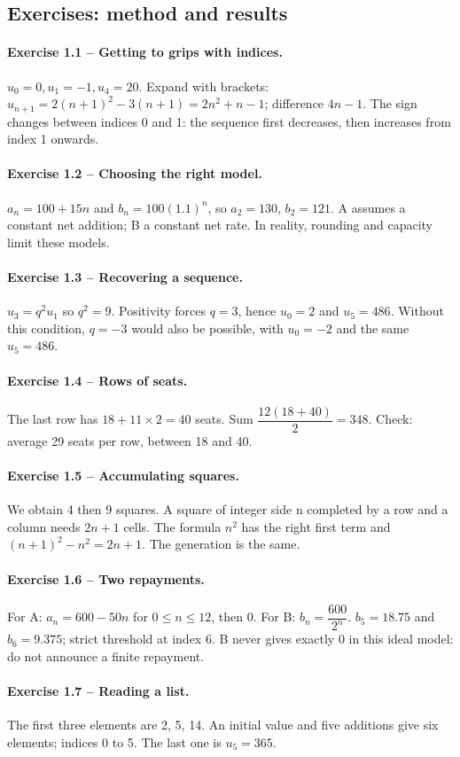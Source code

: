 \subsection*{Exercises: method and results}
\paragraph{Exercise 1.1 -- Getting to grips with indices.} $u_0=0,u_1=-1,u_4=20$. Expand with brackets: $u_{n+1}=2(n+1)^2-3(n+1)=2n^2+n-1$; difference $4n-1$. The sign changes between indices 0 and 1: the sequence first decreases, then increases from index 1 onwards.
\paragraph{Exercise 1.2 -- Choosing the right model.} $a_n=100+15n$ and $b_n=100(\num{1,1})^n$, so $a_2=130$, $b_2=121$. A assumes a constant net addition; B a constant net rate. In reality, rounding and capacity limit these models.
\paragraph{Exercise 1.3 -- Recovering a sequence.} $u_3=q^2u_1$ so $q^2=9$. Positivity forces $q=3$, hence $u_0=2$ and $u_5=486$. Without this condition, $q=-3$ would also be possible, with $u_0=-2$ and the same $u_5=486$.
\paragraph{Exercise 1.4 -- Rows of seats.} The last row has $18+11\times2=40$ seats. Sum $\dfrac{12(18+40)}{2}=348$. Check: average 29 seats per row, between 18 and 40.
\paragraph{Exercise 1.5 -- Accumulating squares.} We obtain 4 then 9 squares. A square of integer side n completed by a row and a column needs $2n+1$ cells. The formula $n^2$ has the right first term and $ (n+1)^2-n^2=2n+1$. The generation is the same.
\paragraph{Exercise 1.6 -- Two repayments.} For A: $a_n=600-50n$ for $0\leq n\leq12$, then 0. For B: $b_n=\dfrac{600}{2^n}$. $b_5=\num{18,75}$ and $b_6=\num{9,375}$; strict threshold at index 6. B never gives exactly 0 in this ideal model: do not announce a finite repayment.
\paragraph{Exercise 1.7 -- Reading a list.} The first three elements are 2, 5, 14. An initial value and five additions give six elements; indices 0 to 5. The last one is $u_5=365$.
